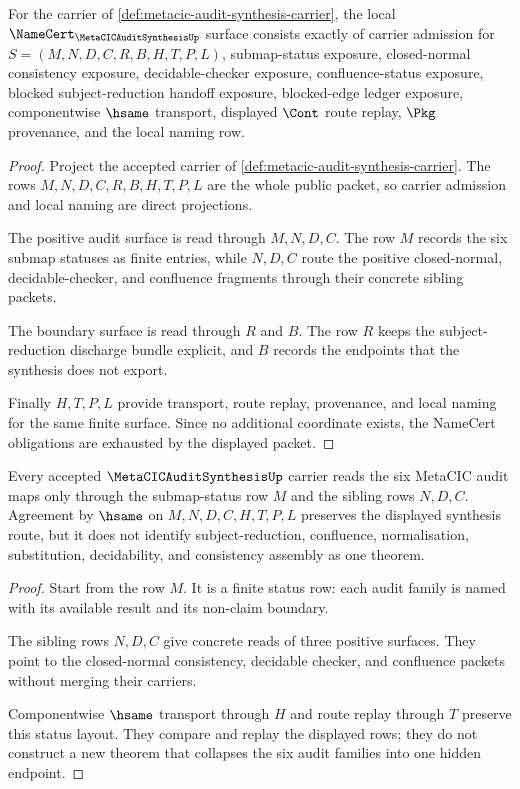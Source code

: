 \begin{theorem}
\label{thm:metacic-audit-synthesis-namecert-obligations}
For the carrier of \autoref{def:metacic-audit-synthesis-carrier}, the local $\NameCert_{\MetaCICAuditSynthesisUp}$ surface consists exactly of carrier admission for $S=(M,N,D,C,R,B,H,T,P,L)$, submap-status exposure, closed-normal consistency exposure, decidable-checker exposure, confluence-status exposure, blocked subject-reduction handoff exposure, blocked-edge ledger exposure, componentwise $\hsame$ transport, displayed $\Cont$ route replay, $\Pkg$ provenance, and the local naming row.
\end{theorem}
\begin{proof}
Project the accepted carrier of \autoref{def:metacic-audit-synthesis-carrier}. The rows $M,N,D,C,R,B,H,T,P,L$ are the whole public packet, so carrier admission and local naming are direct projections.

The positive audit surface is read through $M,N,D,C$. The row $M$ records the six submap statuses as finite entries, while $N,D,C$ route the positive closed-normal, decidable-checker, and confluence fragments through their concrete sibling packets.

The boundary surface is read through $R$ and $B$. The row $R$ keeps the subject-reduction discharge bundle explicit, and $B$ records the endpoints that the synthesis does not export.

Finally $H,T,P,L$ provide transport, route replay, provenance, and local naming for the same finite surface. Since no additional coordinate exists, the NameCert obligations are exhausted by the displayed packet.
\end{proof}

\begin{theorem}
\label{thm:metacic-audit-synthesis-map-boundary}
Every accepted $\MetaCICAuditSynthesisUp$ carrier reads the six MetaCIC audit maps only through the submap-status row $M$ and the sibling rows $N,D,C$. Agreement by $\hsame$ on $M,N,D,C,H,T,P,L$ preserves the displayed synthesis route, but it does not identify subject-reduction, confluence, normalisation, substitution, decidability, and consistency assembly as one theorem.
\end{theorem}
\begin{proof}
Start from the row $M$. It is a finite status row: each audit family is named with its available result and its non-claim boundary.

The sibling rows $N,D,C$ give concrete reads of three positive surfaces. They point to the closed-normal consistency, decidable checker, and confluence packets without merging their carriers.

Componentwise $\hsame$ transport through $H$ and route replay through $T$ preserve this status layout. They compare and replay the displayed rows; they do not construct a new theorem that collapses the six audit families into one hidden endpoint.
\end{proof}

